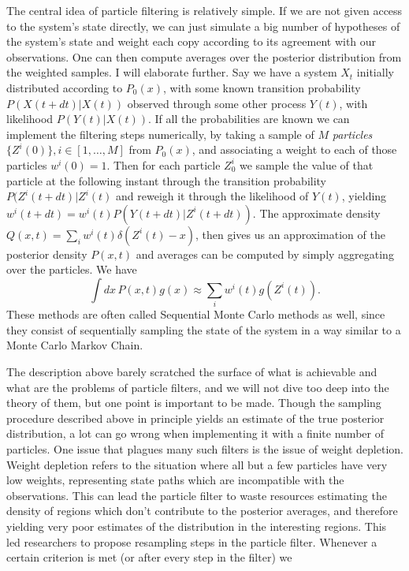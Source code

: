 The central idea of particle filtering is relatively simple. If we are not given access to the system's state directly, we can just simulate a big number of hypotheses of 
the  system's state and weight each copy according to its agreement with our observations. One can then compute averages over the posterior distribution from the 
weighted samples. I will elaborate further. Say we have a system $X_t$ initially distributed according to $P_0(x)$, with some known transition probability $P(X(t+dt)|
X(t))$ observed through some other process $Y(t)$, with likelihood $P(Y(t)|X(t))$. If all the probabilities are known we can implement the filtering steps numerically,
by taking a sample of $M$ \emph{particles} $\{Z^i(0)\}, i \in [1,\ldots,M]$ from $P_0(x)$, and associating a weight to each of those 
particles $w^i(0)= 1$. Then for each 
particle $Z^i_0$ we sample the value of that particle at the following instant through the transition probability $P(Z^i(t+dt)|Z^i(t)$ and reweigh it through the likelihood
of $Y(t)$, yielding $w^i(t+dt) = w^i(t) P(Y(t+dt) | Z^i(t+dt))$. The approximate density $Q(x,t) = \sum_i w^i(t)\delta(Z^i(t) - x)$, then gives us an approximation of the
posterior density $P(x,t)$ and averages can be computed by simply aggregating over the particles. We have
\[
\int dx\, P(x,t) g(x)  \approx \sum_i w^i(t) g(Z^i(t)).
\]
These methods are often called Sequential Monte Carlo methods as well, since they consist of sequentially sampling the 
state of the system in a way similar to a Monte Carlo Markov Chain.\par
The description above barely scratched the surface of what is achievable and what are the problems of particle filters, and we will not dive too deep into the theory of
them, but one point is important to be made. Though the sampling procedure described above in principle yields an estimate of the true posterior distribution, a lot can
go wrong when implementing it with a finite number of particles. One issue that plagues many such filters is the issue of weight depletion. Weight depletion refers
to the situation where all but a few particles have very low weights, representing state paths which are incompatible with the observations. This can lead the particle
filter to waste resources estimating the density of regions which don't contribute to the posterior averages, and therefore yielding very poor estimates of the distribution
in the interesting regions. This led researchers to propose resampling steps in the particle filter. Whenever a certain criterion is met (or after every step in the filter) we
